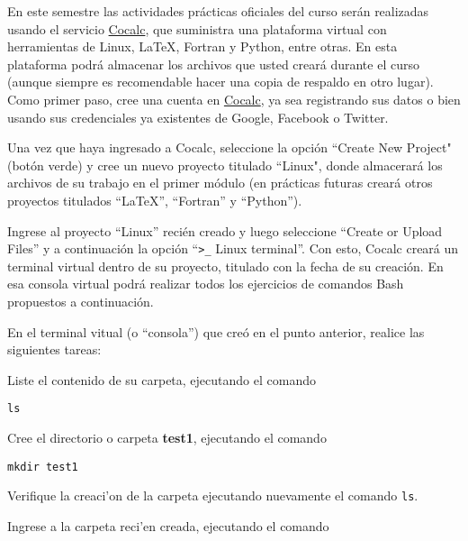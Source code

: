 \documentclass[11pt]{exam}
\begin{document}
\begin{questions}

\item En este semestre las actividades prácticas oficiales del curso serán realizadas usando el servicio \href{https://cocalc.com}{Cocalc}, que suministra una plataforma virtual con herramientas de Linux, \LaTeX, Fortran y Python, entre otras. En esta plataforma podrá almacenar los archivos que usted creará durante el curso (aunque siempre es recomendable hacer una copia de respaldo en otro lugar). Como primer paso, cree una cuenta en \href{https://cocalc.com}{Cocalc}, ya sea registrando sus datos o bien usando sus credenciales ya existentes de Google, Facebook o Twitter.

\item Una vez que haya ingresado a Cocalc, seleccione la opción ``Create New Project" (botón verde) y cree un nuevo proyecto titulado ``Linux", donde almacerará los archivos de su trabajo en el primer módulo (en prácticas futuras creará otros proyectos titulados ``LaTeX'', ``Fortran'' y ``Python'').

\item Ingrese al proyecto ``Linux'' recién creado y luego seleccione ``Create or Upload Files'' y a continuación la opción ``\verb!>_! Linux terminal''. Con esto, Cocalc creará un terminal virtual dentro de su proyecto, titulado con la fecha de su creación. En esa consola virtual podrá realizar todos los ejercicios de comandos Bash propuestos a continuación.

\item En el terminal vitual (o ``consola'') que creó en el punto anterior, realice las siguientes tareas:
\begin{parts}
\item Liste el contenido de su carpeta, ejecutando el comando 

\begin{verbatim}
ls
\end{verbatim}

\item Cree el directorio o carpeta \textbf{test1}, ejecutando el comando 

\begin{verbatim}
mkdir test1
\end{verbatim}

Verifique la creaci'on de la carpeta ejecutando nuevamente el comando \texttt{ls}.

\item Ingrese a la carpeta reci'en creada, ejecutando el comando 


\end{parts}
\end{questions}
\end{document}
